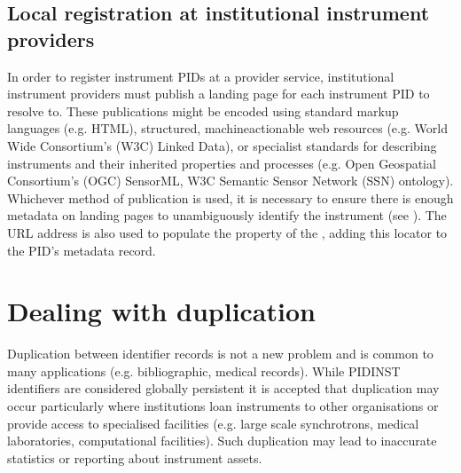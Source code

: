 \documentclass[a4paper,10pt,english]{sphinxmanual}
\begin{document}
\subsection{Local registration at institutional instrument providers}
\label{\detokenize{white-paper/registration:local-registration-at-institutional-instrument-providers}}
\sphinxAtStartPar
In order to register instrument PIDs at a provider service,
institutional instrument providers must publish a landing page for each
instrument PID to resolve to. These publications might be encoded using
standard markup languages (e.g. HTML), structured, machine\sphinxhyphen{}actionable
web resources (e.g. World Wide Consortium’s (W3C) Linked Data), or
specialist standards for describing instruments and their inherited
properties and processes (e.g. Open Geospatial Consortium’s (OGC)
SensorML, W3C Semantic Sensor Network (SSN) ontology). Whichever method
of publication is used, it is necessary to ensure there is enough
metadata on landing pages to unambiguously identify the instrument (see
{\hyperref[\detokenize{white-paper/landing-page-content:landing-page-content}]{}}). The URL address is also used to populate
the  property of the , adding this
locator to the PID’s metadata record.


\section{Dealing with duplication}
\label{\detokenize{white-paper/duplication:dealing-with-duplication}}\label{\detokenize{white-paper/duplication::doc}}
\sphinxAtStartPar
Duplication between identifier records is not a new problem and is
common to many applications (e.g. bibliographic, medical records).
While PIDINST identifiers are considered globally persistent it is
accepted that duplication may occur particularly where institutions
loan instruments to other organisations or provide access to
specialised facilities (e.g. large scale synchrotrons, medical
laboratories, computational facilities).  Such duplication may lead to
inaccurate statistics or reporting about instrument assets.
\end{document}
